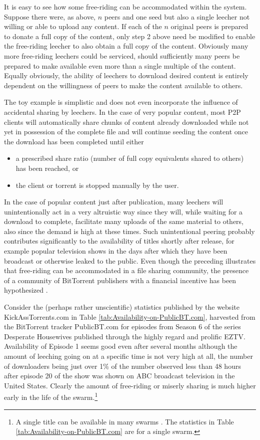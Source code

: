 \documentclass[12pt,english]{apa6}
\begin{document}
It is easy to see how some free-riding can be accommodated within
the system. Suppose there were, as above, $n$ peers and one seed
but also a single leecher not willing or able to upload any content.
If each of the $n$ original peers is prepared to donate a full copy
of the content, only step 2 above need be modified to enable the free-riding
leecher to also obtain a full copy of the content. Obviously many
more free-riding leechers could be serviced, should sufficiently many
peers be prepared to make available even more than a single multiple
of the content. Equally obviously, the ability of leechers to download
desired content is entirely dependent on the willingness of peers
to make the content available to others.

The toy example is simplistic and does not even incorporate the influence
of accidental sharing by leechers. In the case of very popular content,
most P2P clients will automatically share chunks of content already
downloaded while not yet in possession of the complete file and will
continue seeding the content once the download has been completed
until either
\begin{itemize}
\item a prescribed share ratio (number of full copy equivalents shared to
others) has been reached, or
\item the client or torrent is stopped manually by the user.
\end{itemize}
In the case of popular content just after publication, many leechers
will unintentionally act in a very altruistic way since they will,
while waiting for a download to complete, facilitate many uploads
of the same material to others, also since the demand is high at these
times. Such unintentional peering probably contributes significantly
to the availability of titles shortly after release, for example popular
television shows in the days after which they have been broadcast
or otherwise leaked to the public. Even though the preceding illustrates
that free-riding can be accommodated in a file sharing community,
the presence of a community of BitTorrent publishers with a financial
incentive has been hypothesized \citep{Cuevas:2010:CPB:1921168.1921183}.

Consider the (perhaps rather unscientific) statistics published by
the website KickAssTorrents.com in Table \ref{tab:Availability-on-PublicBT.com},
harvested from the BitTorrent tracker PublicBT.com for episodes from
Season 6 of the series Desperate Housewives published through the
highly regard and prolific EZTV. Availability of Episode 1 seems good
even after several months although the amount of leeching going on
at a specific time is not very high at all, the number of downloaders
being just over 1\% of the number observed less than 48 hours after
episode 20 of the show was shown on ABC broadcast television in the
United States. Clearly the amount of free-riding or miserly sharing
is much higher early in the life of the swarm.\footnote{A single title can be available in many swarms \citep{VinkoEA}. The
statistics in Table \ref{tab:Availability-on-PublicBT.com} are for
a single swarm.}
\end{document}
